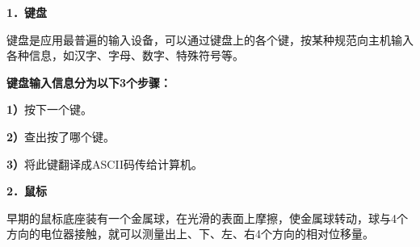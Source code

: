 {\textbf{1．键盘}}

键盘是应用最普遍的输入设备，可以通过键盘上的各个键，按某种规范向主机输入各种信息，如汉字、字母、数字、特殊符号等。

\textbf{键盘输入信息分为以下3个步骤：}

\textbf{1）}按下一个键。

\textbf{2）}查出按了哪个键。

\textbf{3）}将此键翻译成ASCII码传给计算机。

{\textbf{2．鼠标}}

早期的鼠标底座装有一个金属球，在光滑的表面上摩擦，使金属球转动，球与4个方向的电位器接触，就可以测量出上、下、左、右4个方向的相对位移量。\\
